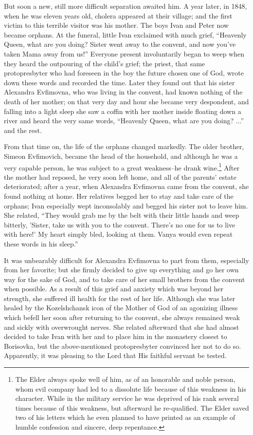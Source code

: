 But soon a new, still more difficult separation awaited him. A year later, in 1848, when he was eleven years old, cholera appeared at their village; and the first victim to this terrible visitor was his mother. The boys Ivan and Peter now became orphans. At the funeral, little Ivan exclaimed with much grief, ``Heavenly Queen, what are you doing? Sister went away to the convent, and now you've taken Mama away from us!'' Everyone present involuntarily began to weep when they heard the outpouring of the child's grief; the priest, that same protopresbyter who had foreseen in the boy the future chosen one of God, wrote down these words and recorded the time. Later they found out that his sister Alexandra Evfimovna, who was living in the convent, had known nothing of the death of her mother; on that very day and hour she became very despondent, and falling into a light sleep she saw a coffin with her mother inside floating down a river and heard the very same words, ``Heavenly Queen, what are you doing? ...'' and the rest.

From that time on, the life of the orphans changed markedly. The older brother, Simeon Evfimovich, became the head of the household, and although he was a very capable person, he was subject to a great weakness--he drank wine.\footnote{The Elder always spoke well of him, as of an honorable and noble person, whom evil company had led to a dissolute life because of this weakness in his character. While in the military service he was deprived of his rank several times because of this weakness, but afterward he re-qualified. The Elder saved two of his letters which he even planned to have printed as an example of humble confession and sincere, deep repentance.} After the mother had reposed, he very soon left home, and all of the parents' estate deteriorated; after a year, when Alexandra Evfimovna came from the convent, she found nothing at home. Her relatives begged her to stay and take care of the orphans; Ivan especially wept inconsolably and begged his sister not to leave him. She related, ``They would grab me by the belt with their little hands and weep bitterly, 'Sister, take us with you to the convent. There's no one for us to live with here!' My heart simply bled, looking at them. Vanya would even repeat these words in his sleep.''

It was unbearably difficult for Alexandra Evfimovna to part from them, especially from her favorite; but she firmly decided to give up everything and go her own way for the sake of God, and to take care of her small brothers from the convent when possible. As a result of this grief and anxiety which was beyond her strength, she suffered ill health for the rest of her life. Although she was later healed by the Kozelshchansk icon of the Mother of God of an agonizing illness which befell her soon after returning to the convent, she always remained weak and sickly with overwrought nerves. She related afterward that she had almost decided to take Ivan with her and to place him in the monastery closest to Borisovka, but the above-mentioned protopresbyter convinced her not to do so. Apparently, it was pleasing to the Lord that His faithful servant be tested.

